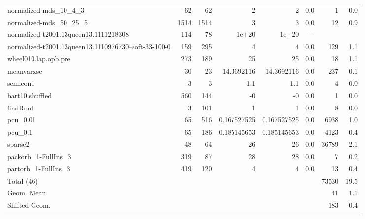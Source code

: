\documentclass[leqno]{article}
\begin{document}
\begin{center}
\begin{supertabular*}{\textwidth}{@{\extracolsep{\fill}}lrrrrrrr@{}}
normalized-mds\_10\_4\_3 &     62 &     62 &                2 &                2 &    0.0 &         1 &      0.0\\
normalized-mds\_50\_25\_5 &   1514 &   1514 &                3 &                3 &    0.0 &        12 &      0.9\\
normalized-t2001.13queen13.1111218308 &    114 &     78 &            1e+20 &            1e+20 &   --   & &\\
normalized-t2001.13queen13.1110976730--soft-33-100-0 &    159 &    295 &                4 &                4 &    0.0 &       129 &      1.1\\
wheel010.lap.opb.pre &    273 &    189 &               25 &               25 &    0.0 &        18 &      1.1\\
meanvarxsc         &     30 &     23 &       14.3692116 &       14.3692116 &    0.0 &       237 &      0.1\\
semicon1           &      3 &      3 &              1.1 &              1.1 &    0.0 &         4 &      0.0\\
bart10.shuffled    &    560 &    144 &               -0 &               -0 &    0.0 &         1 &      0.0\\
findRoot           &      3 &    101 &                1 &                1 &    0.0 &         8 &      0.0\\
pcu\_0.01          &     65 &    516 &      0.167527525 &      0.167527525 &    0.0 &      6938 &      1.0\\
pcu\_0.1           &     65 &    186 &      0.185145653 &      0.185145653 &    0.0 &      4123 &      0.4\\
sparse2            &     48 &     64 &               26 &               26 &    0.0 &     36789 &      2.1\\
packorb\_1-FullIns\_3 &    319 &     87 &               28 &               28 &    0.0 &         7 &      0.2\\
partorb\_1-FullIns\_3 &    419 &    120 &                4 &                4 &    0.0 &        13 &      0.4\\
\midrule
Total          (46) &        &        &                &                &        &     73530 &     19.5\\
Geom. Mean          &        &        &                &                &        &        41 &      1.1\\
Shifted Geom.       &        &        &                &                &        &       183 &      0.4 \\
\noalign{\vspace{6pt}}
\end{supertabular*}
\end{center}
\end{document}
